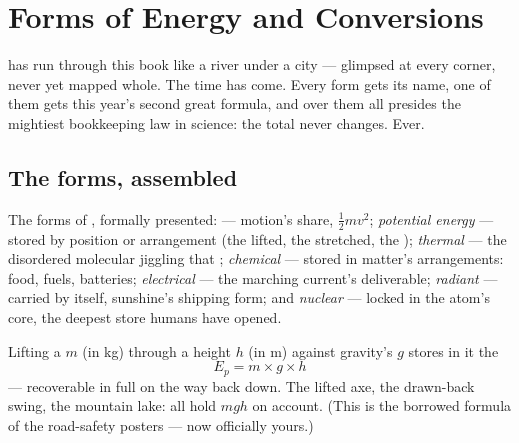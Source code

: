 \chapter{Forms of Energy and Conversions}\label{ch:g9:energy-conversions}

 has run through this book like a river under a city ---
glimpsed at every corner, never yet mapped whole. The time has
come. Every form gets its name, one of them gets this year's
second great formula, and over them all presides the mightiest
bookkeeping law in science: the total never changes. Ever.

\section{The forms, assembled}

\begin{definition}\label{def:g9:energy-conversions:forms}
The forms of , formally presented:
\emph{} --- motion's share, $\frac12 m v^2$;
\emph{potential energy} --- stored by
position or arrangement (the lifted, the stretched, the
); \emph{thermal } --- the disordered
molecular jiggling that  ;
\emph{chemical } --- stored in matter's arrangements:
food, fuels, batteries; \emph{electrical } --- the
marching current's deliverable; \emph{radiant } ---
carried by  itself, sunshine's shipping form; and
\emph{nuclear } --- locked in the atom's core, the
deepest store humans have opened.
\end{definition}

\begin{proposition}\label{prop:g9:energy-conversions:ep}
Lifting a  $m$ (in \unit{kg}) through a height $h$ (in
\unit{m}) against gravity's $g$ stores in it the 
\[
E_p = m \times g \times h
\]
 --- recoverable in full on the way back down. The
lifted axe, the drawn-back swing, the mountain lake: all hold
$m g h$ on account. (This is the borrowed formula of the
road-safety posters --- now officially yours.)
\end{proposition}


